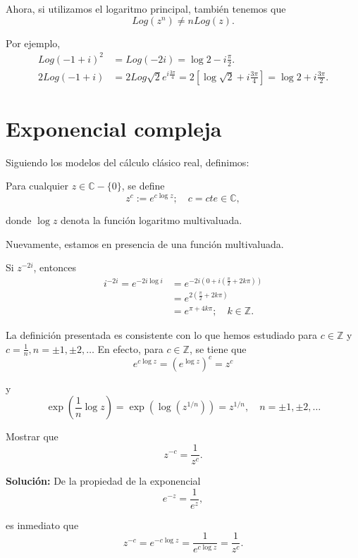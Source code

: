 Ahora, si utilizamos el logaritmo principal, también tenemos que 
$$Log(z^n) \neq n Log(z).$$

Por ejemplo, 
\begin{align*}
Log(-1+i)^2 &= Log(-2i) = \log 2 -i \frac{\pi}{2}. \\
2 Log (-1+i) &= 2 Log \sqrt{2} e^{i \frac{3\pi}{4}} = 2 \left[\log \sqrt{2} + i \frac{3\pi}{4}\right] = \log 2 + i \frac{3\pi}{2}.
\end{align*}

\section{Exponencial compleja}

Siguiendo los modelos del cálculo clásico real, definimos:

\begin{defi}
Para cualquier $z \in \mathbb{C} - \{0\}$, se define 
$$z^c := e^{c \log z}; \quad c = cte \in \mathbb{C},$$

donde $\log z$ denota la función logaritmo multivaluada.
\end{defi}

Nuevamente, estamos en presencia de una función multivaluada.

\begin{ejemplo}
Si $z^{-2i}$, entonces
\begin{align*}
i^{-2i} = e^{-2i \log i} &= e^{-2i \left( 0 + i \left( \frac{\pi}{2} + 2k\pi \right) \right)} \\
&= e^{2 \left( \frac{\pi}{2} + 2k\pi \right)} \\
&= e^{\pi + 4k\pi}; \quad k \in \mathbb{Z}.
\end{align*}
\end{ejemplo}

La definición presentada es consistente con lo que hemos estudiado para $c \in \mathbb{Z}$ y $c = \frac{1}{n}, n = \pm 1, \pm 2, \dots$ En efecto,  para $c  \in \mathbb{Z}$, se tiene que
$$e^{c \log z} = \left(e^{\log z}\right)^c = z^c$$

y
$$\exp\left( \frac{1}{n} \log z \right) = \exp\left( \log \left(z^{1/n}\right) \right) = z^{1/n}, \quad n = \pm 1, \pm 2, \dots$$

\begin{ejemplo}
Mostrar que 
$$z^{-c} = \frac{1}{z^c}.$$

\textbf{Solución:} De la propiedad de la exponencial 
$$e^{-z} = \frac{1}{e^z},$$

es inmediato que 
$$z^{-c} = e^{-c\log z} = \frac{1}{e^{c \log z}} = \frac{1}{z^c}.$$
\end{ejemplo}

